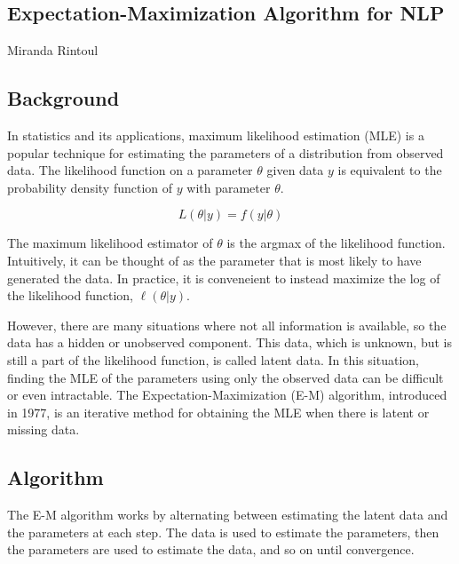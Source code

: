\documentclass[14pt]{article}
\begin{document}

\begin{center}
\section*{Expectation-Maximization Algorithm for NLP}

Miranda Rintoul

\subsection*{Background}
\end{center}

In statistics and its applications, maximum likelihood estimation (MLE) is a popular technique for estimating the parameters of a distribution from observed data. The likelihood function on a parameter $\theta$ given data $y$ is equivalent to the probability density function of $y$ with parameter $\theta$.

$$L(\theta|y) = f(y|\theta)$$

The maximum likelihood estimator of $\theta$ is the argmax of the likelihood function.  Intuitively, it can be thought of as the parameter that is most likely to have generated the data.  In practice, it is conveneient to instead maximize the log of the likelihood function, $\ell(\theta|y)$.

However, there are many situations where not all information is available, so the data has a hidden or unobserved component.  This data, which is unknown, but is still a part of the likelihood function, is called latent data.  In this situation, finding the MLE of the parameters using only the observed data can be difficult or even intractable.  The Expectation-Maximization (E-M) algorithm, introduced in 1977, is an iterative method for obtaining the MLE when there is latent or missing data.

\begin{center}
\subsection*{Algorithm}
\end{center}

The E-M algorithm works by alternating between estimating the latent data and the parameters at each step.  The data is used to estimate the parameters, then the parameters are used to estimate the data, and so on until convergence.
\end{document}
